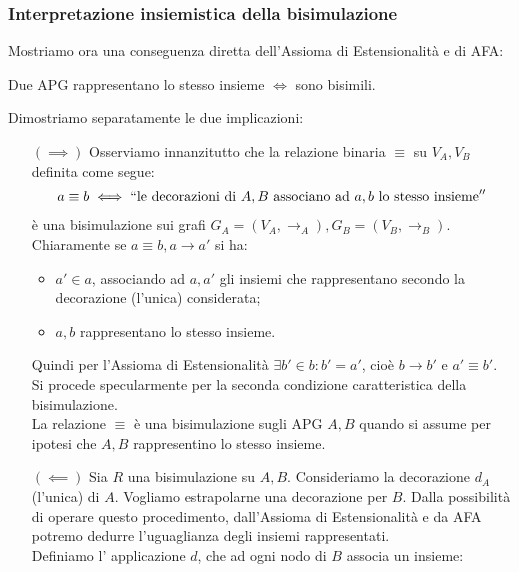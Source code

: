 \subsubsection{Interpretazione insiemistica della bisimulazione}
Mostriamo ora una conseguenza diretta dell'Assioma di Estensionalità e di AFA:
\begin{theorem}
    Due APG rappresentano lo stesso insieme $\iff$ sono bisimili.
    \label{theo:bisi_iff_eqsets}
\end{theorem}
\begin{proof2}
    Dimostriamo separatamente le due implicazioni:
    \begin{enumerate}
        \item[$(\implies)$] Osserviamo innanzitutto che la relazione binaria $\equiv$ su $V_A, V_B$ definita come segue:
              \begin{gather*}
                  a \equiv b \iff ``\text{le decorazioni di } A,B \text{ associano ad } a,b \text{ lo stesso insieme}''
              \end{gather*}
              è una bisimulazione sui grafi $G_A = (V_A, \to_A), G_B = (V_B, \to_B)$.\\
              Chiaramente se $a \equiv b, a \to a'$ si ha:
              \begin{itemize}
                  \item $a' \in a$, associando ad $a,a'$ gli insiemi che rappresentano secondo la decorazione (l'unica) considerata;
                  \item $a,b$ rappresentano lo stesso insieme.
              \end{itemize}
              Quindi per l'Assioma di Estensionalità $\exists b' \in b: b' = a'$, cioè $b \to b'$ e $a' \equiv b'$. Si procede specularmente per la seconda condizione caratteristica della bisimulazione.\\
              La relazione $\equiv$ è una bisimulazione sugli APG $A,B$ quando si assume per ipotesi che $A,B$ rappresentino lo stesso insieme.
        \item[$(\impliedby)$] Sia $R$ una bisimulazione su $A,B$. Consideriamo la decorazione $d_A$ (l'unica) di $A$. Vogliamo estrapolarne una decorazione per $B$. Dalla possibilità di operare questo procedimento, dall'Assioma di Estensionalità e da AFA potremo dedurre l'uguaglianza degli insiemi rappresentati.\\
              Definiamo l' applicazione $d$, che ad ogni nodo di $B$ associa un insieme:
              \begin{gather*}

\end{gather*}
\end{enumerate}
\end{proof2}
